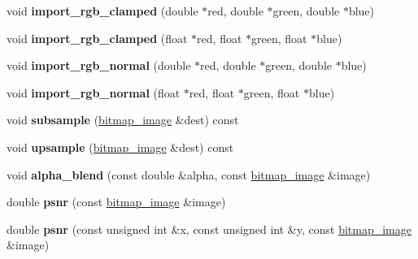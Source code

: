 \begin{DoxyCompactItemize}
void {\bfseries import\+\_\+rgb\+\_\+clamped} (double $\ast$red, double $\ast$green, double $\ast$blue)
\item 
\mbox{\label{classbitmap__image_a72f4d251c74bbc90db5db100712e0010}} 
void {\bfseries import\+\_\+rgb\+\_\+clamped} (float $\ast$red, float $\ast$green, float $\ast$blue)
\item 
\mbox{\label{classbitmap__image_a436c773d02db0a40f7eee6d6ce4b2f63}} 
void {\bfseries import\+\_\+rgb\+\_\+normal} (double $\ast$red, double $\ast$green, double $\ast$blue)
\item 
\mbox{\label{classbitmap__image_abb63e9287fe3643f5714ed8a21d693d8}} 
void {\bfseries import\+\_\+rgb\+\_\+normal} (float $\ast$red, float $\ast$green, float $\ast$blue)
\item 
\mbox{\label{classbitmap__image_ae696a8c23f2740d57e79099eabf2b5f2}} 
void {\bfseries subsample} (\mbox{\hyperlink{classbitmap__image}{bitmap\+\_\+image}} \&dest) const
\item 
\mbox{\label{classbitmap__image_a740924a5e9a2c3ac4db49471c8354745}} 
void {\bfseries upsample} (\mbox{\hyperlink{classbitmap__image}{bitmap\+\_\+image}} \&dest) const
\item 
\mbox{\label{classbitmap__image_a92b25517c4d5bd6be9c7617881476bc4}} 
void {\bfseries alpha\+\_\+blend} (const double \&alpha, const \mbox{\hyperlink{classbitmap__image}{bitmap\+\_\+image}} \&image)
\item 
\mbox{\label{classbitmap__image_af3cfd1f854f21163045ffe0f7a8d4d73}} 
double {\bfseries psnr} (const \mbox{\hyperlink{classbitmap__image}{bitmap\+\_\+image}} \&image)
\item 
\mbox{\label{classbitmap__image_a0ffa272029dc2ccd5d82dbb6fdd2e63f}} 
double {\bfseries psnr} (const unsigned int \&x, const unsigned int \&y, const \mbox{\hyperlink{classbitmap__image}{bitmap\+\_\+image}} \&image)
\item 
\mbox{\label{classbitmap__image_a3f83be040ae572ec83a10f84c4d80912}} 

\end{DoxyCompactItemize}
